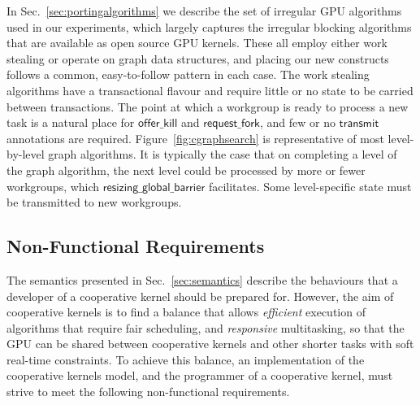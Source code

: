 \documentclass[parskip=half,sigconf,review, anonymous=true, acmcopyrightmode=none]{acmart}
\makeatletter
\renewcommand\paragraph{\@startsection{paragraph}{4}{\z@}%
  {-.5\baselineskip \@plus -2\p@ \@minus -.2\p@}%
  {-3.5\p@}%
  {\bfseries\@parfont}}
\newcommand{\myfiglong}{Figure~}
\newcommand{\mysec}{Sec.~}
\newcommand{\transmit}{\mathsf{transmit}}
\newcommand{\offerfork}{\mathsf{request\_fork}}
\newcommand{\offerkill}{\mathsf{offer\_kill}}
\newcommand{\resizingglobalbarrier}{\mathsf{resizing\_global\_barrier}}
\makeatother
\begin{document}
In \mysec\ref{sec:portingalgorithms} we describe the set of irregular GPU algorithms used
in our experiments, which largely captures the irregular blocking
algorithms that are available as open source GPU kernels.  These all
employ either work stealing or operate on graph data structures, and placing our new constructs follows a common, easy-to-follow pattern in each case.
%
The work stealing algorithms have a transactional flavour
and require little or no state to be carried between transactions.  The point at which a workgroup is ready to process a new task is a natural place for $\offerkill$ and $\offerfork$, and few or no $\transmit$ annotations are required.
%
\myfiglong\ref{fig:cgraphsearch} is representative of
most level-by-level graph algorithms.
It is typically the case that on completing a level of
the graph algorithm, the next level could be processed by more or
fewer workgroups, which $\resizingglobalbarrier$
facilitates.  Some level-specific state must be transmitted to new workgroups.



\subsection{Non-Functional Requirements}\label{sec:nonfunctional}

The semantics presented in \mysec\ref{sec:semantics} describe the
behaviours that a developer of a cooperative kernel should be prepared
for.
%
However, the aim of cooperative kernels is to find a balance that
allows \emph{efficient} execution of algorithms that require fair scheduling, and
\emph{responsive} multitasking, so that the GPU can be shared between
cooperative kernels and other shorter tasks with soft real-time constraints.
%
To achieve this balance, an implementation of the cooperative
kernels model, and the programmer of a cooperative kernel, must strive
to meet the following non-functional requirements.

\end{document}
